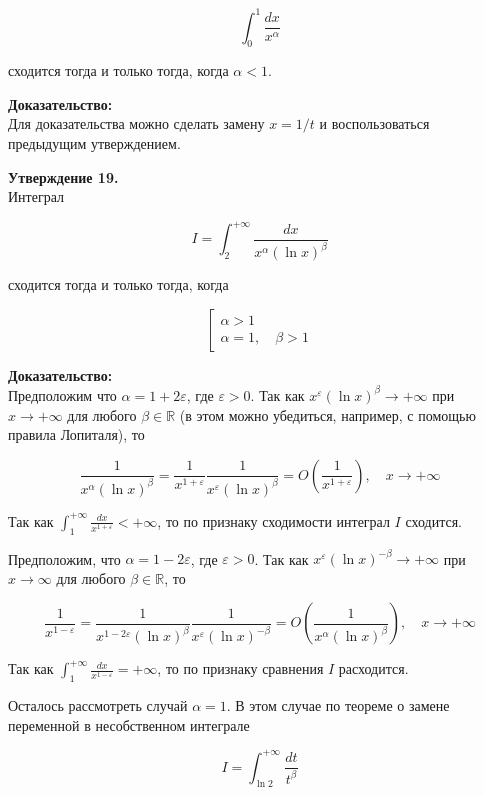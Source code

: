 \documentclass[a4paper,12pt]{article} %
\begin{document}
	$$
	\int_{0}^{1} \frac{d x}{x^{\alpha}}
	$$
	
	сходится тогда и только тогда, когда $\alpha<1$.
	
	\textbf{Доказательство:\\}
	Для доказательства можно сделать замену $x=1 / t$ и воспользоваться предыдущим утверждением.
	
	\textbf{Утверждение 19.}\\
	
	Интеграл
	
	$$
	I=\int_{2}^{+\infty} \frac{d x}{x^{\alpha}(\ln x)^{\beta}}
	$$
	
	сходится тогда и только тогда, когда
	
	$$
	\left[\begin{array}{l}
	\alpha>1 \\
	\alpha=1, \quad \beta>1
	\end{array}\right.
	$$
	
	\textbf{Доказательство:\\}
	Предположим что $\alpha=1+2 \varepsilon$, где $\varepsilon>0$. Так как $x^{\varepsilon}(\ln x)^{\beta} \rightarrow+\infty$ при $x \rightarrow+\infty$ для любого $\beta \in \mathbb{R}$ (в этом можно убедиться, например, с помощью правила Лопиталя), то
	
	$$
	\frac{1}{x^{\alpha}(\ln x)^{\beta}}=\frac{1}{x^{1+\varepsilon}} \frac{1}{x^{\varepsilon}(\ln x)^{\beta}}=O\left(\frac{1}{x^{1+\varepsilon}}\right), \quad x \rightarrow+\infty
	$$
	
	Так как $\int_{1}^{+\infty} \frac{d x}{x^{1+\varepsilon}}<+\infty$, то по признаку сходимости интеграл $I$ сходится.
	
	Предположим, что $\alpha=1-2 \varepsilon$, где $\varepsilon>0$. Так как $x^{\varepsilon}(\ln x)^{-\beta} \rightarrow+\infty$ при $x \rightarrow \infty$ для любого $\beta \in \mathbb{R}$, то
	
	$$
	\frac{1}{x^{1-\varepsilon}}=\frac{1}{x^{1-2 \varepsilon}(\ln x)^{\beta}} \frac{1}{x^{\varepsilon}(\ln x)^{-\beta}}=O\left(\frac{1}{x^{\alpha}(\ln x)^{\beta}}\right), \quad x \rightarrow+\infty
	$$
	
	Так как $\int_{1}^{+\infty} \frac{d x}{x^{1-\varepsilon}}=+\infty$, то по признаку сравнения $I$ расходится.
	
	Осталось рассмотреть случай $\alpha=1$. В этом случае по теореме о замене переменной в несобственном интеграле
	
	$$
	I=\int_{\ln 2}^{+\infty} \frac{d t}{t^{\beta}}
	$$
	
\end{document}
